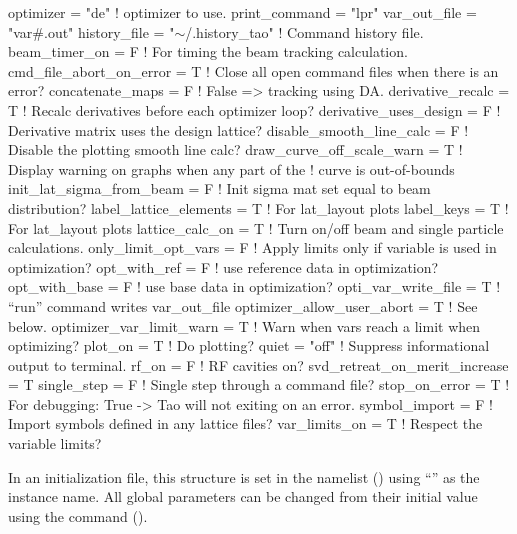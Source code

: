 {{{{{{{{\begin{example}
  optimizer     = "de"             ! optimizer to use.
  print_command = "lpr"
  var_out_file  = "var#.out"
  history_file = "\(\sim\)/.history_tao"  ! Command history file.
  beam_timer_on = F                ! For timing the beam tracking calculation.
  cmd_file_abort_on_error = T      ! Close all open command files when there is an error?
  concatenate_maps = F             ! False => tracking using DA.
  derivative_recalc = T            ! Recalc derivatives before each optimizer loop?
  derivative_uses_design = F       ! Derivative matrix uses the design lattice?
  disable_smooth_line_calc = F     ! Disable the plotting smooth line calc?
  draw_curve_off_scale_warn = T    ! Display warning on graphs when any part of the 
                                   !   curve is out-of-bounds
  init_lat_sigma_from_beam = F     ! Init sigma mat set equal to beam distribution? 
  label_lattice_elements = T       ! For lat_layout plots
  label_keys = T                   ! For lat_layout plots
  lattice_calc_on = T              ! Turn on/off beam and single particle calculations.
  only_limit_opt_vars = F          ! Apply limits only if variable is used in optimization?
  opt_with_ref = F                 ! use reference data in optimization?
  opt_with_base = F                ! use base data in optimization?
  opti_var_write_file = T          ! ``run'' command writes var_out_file
  optimizer_allow_user_abort = T   ! See below.
  optimizer_var_limit_warn = T     ! Warn when vars reach a limit when optimizing?
  plot_on = T                      ! Do plotting?
  quiet = "off"                    ! Suppress informational output to terminal.
  rf_on = F                        ! RF cavities on?
  svd_retreat_on_merit_increase = T    
  single_step = F                  ! Single step through a command file?
  stop_on_error = T                ! For debugging: True -> Tao will not exiting on an error.
  symbol_import = F                ! Import symbols defined in any lattice files?
  var_limits_on = T                ! Respect the variable limits?
\end{example}

In an initialization file, this structure is set in the  namelist ()
using ``'' as the instance name. All global parameters can be changed from their initial
value using the  command ().

}}}}}}}}
